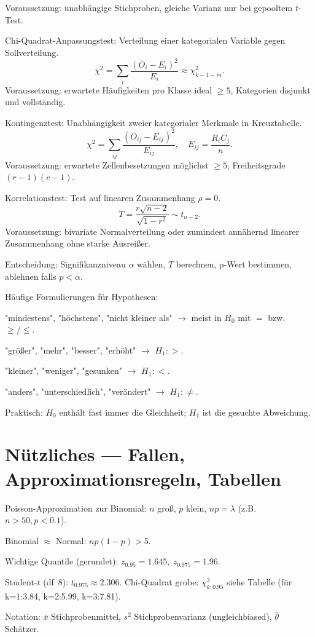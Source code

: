 \documentclass[11pt,a4paper]{article}
\begin{document}
\begin{compactenum}
Voraussetzung: unabhängige Stichproben, gleiche Varianz nur bei gepooltem $t$-Test.
\item Chi-Quadrat-Anpassungstest: Verteilung einer kategorialen Variable gegen Sollverteilung.
\[\chi^2=\sum_i\frac{(O_i-E_i)^2}{E_i}\approx\chi^2_{k-1-m}.\]
Voraussetzung: erwartete Häufigkeiten pro Klasse ideal $\ge 5$, Kategorien disjunkt und vollständig.
\item Kontingenztest: Unabhängigkeit zweier kategorialer Merkmale in Kreuztabelle.
\[\chi^2=\sum_{ij}\frac{(O_{ij}-E_{ij})^2}{E_{ij}},\quad E_{ij}=\frac{R_iC_j}{n}.\]
Voraussetzung: erwartete Zellenbesetzungen möglichst $\ge 5$; Freiheitsgrade $(r-1)(c-1)$.
\item Korrelationstest: Test auf linearen Zusammenhang $\rho=0$.
\[T=\frac{r\sqrt{n-2}}{\sqrt{1-r^2}}\sim t_{n-2}.\]
Voraussetzung: bivariate Normalverteilung oder zumindest annähernd linearer Zusammenhang ohne starke Ausreißer.
\item Entscheidung: Signifikanzniveau $\alpha$ wählen, $T$ berechnen, p-Wert bestimmen, ablehnen falls $p<\alpha$.
\item Häufige Formulierungen für Hypothesen:
\begin{compactenum}
\item "mindestens", "höchstens", "nicht kleiner als" $\to$ meist in $H_0$ mit $=$ bzw. $\ge/\le$.
\item "größer", "mehr", "besser", "erhöht" $\to$ $H_1: >$.
\item "kleiner", "weniger", "gesunken" $\to$ $H_1: <$.
\item "anders", "unterschiedlich", "verändert" $\to$ $H_1: \neq$.
\item Praktisch: $H_0$ enthält fast immer die Gleichheit; $H_1$ ist die gesuchte Abweichung.
\end{compactenum}
\end{compactenum}

\section*{Nützliches — Fallen, Approximationsregeln, Tabellen}
\begin{compactenum}
\item Poisson-Approximation zur Binomial: $n$ groß, $p$ klein, $np=\lambda$ (z.B. $n>50, p<0.1$).
\item Binomial $\approx$ Normal: $np(1-p)>5$.
\item Wichtige Quantile (gerundet): $z_{0.95}=1.645,\ z_{0.975}=1.96.$
\item Student-$t$ (df~8): $t_{0.975}\approx2.306$. Chi-Quadrat grobe: $\chi^2_{k;0.95}$ siehe Tabelle (für k=1:3.84, k=2:5.99, k=3:7.81).
\item Notation: $\bar x$ Stichprobenmittel, $s^2$ Stichprobenvarianz (ungleichbiased), $\hat\theta$ Schätzer.
\end{compactenum}

\end{document}
